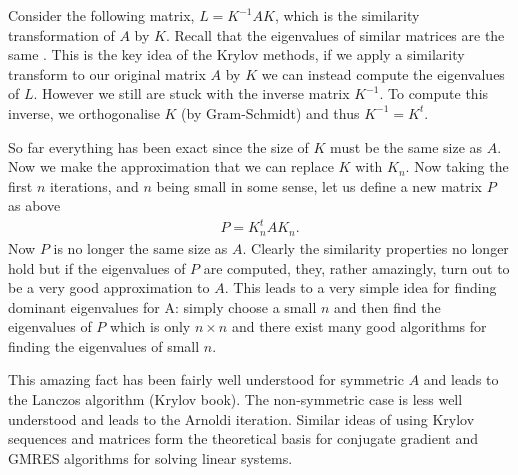 Consider the following matrix, $L=K^{-1}AK$, which is the similarity transformation of $A$ by $K$. Recall that the eigenvalues of similar matrices are the same \cite{MeyerLinAlg}. This is the key idea of the Krylov methods, if we apply a similarity transform to our original matrix $A$ by $K$ we can instead compute the eigenvalues of $L$. However we still are stuck with the inverse matrix $K^{-1}$. To compute this inverse, we orthogonalise $K$ (by Gram-Schmidt) and thus $K^{-1}=K^{t}$. 

So far everything has been exact since the size of $K$ must be the same size as $A$. Now we make the approximation that we can replace $K$ with $K_{n}$. Now taking the first $n$ iterations, and $n$ being small in some sense, let us define a new matrix $P$ as above
\begin{align}
P=K_{n}^{t}AK_{n}.
\end{align}
Now $P$ is no longer the same size as $A$. Clearly the similarity properties no longer hold but if the eigenvalues of $P$ are computed, they, rather amazingly, turn out to be a very good approximation to $A$. This leads to a very simple idea for finding dominant eigenvalues for A: simply choose a small $n$ and then find the eigenvalues of $P$ which is only $n\times n$ and there exist many good algorithms for finding the eigenvalues of small $n$. 

This amazing fact has been fairly well understood for symmetric $A$ and leads to the Lanczos algorithm \cite{MeyerLinAlg} (Krylov book). The non-symmetric case is less well understood and leads to the Arnoldi iteration. Similar ideas of using Krylov sequences and matrices form the theoretical basis for conjugate gradient and GMRES algorithms for solving linear systems.  


